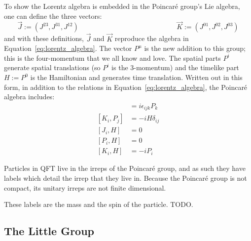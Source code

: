 \documentclass[11pt, oneside]{article}   	%
\theoremstyle{definition}
\begin{document}
To show the Lorentz algebra is embedded in the Poincar\'e group's Lie algebra, one can define the three vectors:
\begin{equation}
	\vec J := (J^{23}, J^{31}, J^{12}) \;\;\;\;\;\;\;\;\;\;\;\;\;\;\;\;\;\;\;\;\;\;\;\;\;\;\;\;\;\;\;\;\;\;\;\;\;\;\;\;\;\;\;\;\;\;\;\;\;\;\;
	\vec K := (J^{01}, J^{02}, J^{03})
\end{equation}
and with these definitions, $\vec J$ and $\vec K$ reproduce the algebra in Equation~\ref{eq:lorentz_algebra}. The 
vector $P^\mu$ is the new addition to this group; this is the four-momentum that we all know and love. The spatial 
parts $P^i$ generate spatial translations (so $P^i$ is the 3-momentum) and the timelike part $H := P^0$ is the Hamiltonian 
and generates time translation. Written out in this form, in addition to the relations in Equation~\ref{eq:lorentz_algebra}, 
the Poincar\'e algebra includes:
\begin{align}
	[J_i, P_j] &= i\epsilon_{ijk} P_k \nonumber \\
	[K_i, P_j] &= -iH\delta_{ij} \nonumber \\
	[J_i, H] &= 0 \label{eq:poincare_algebra_2} \\
	[P_i, H] &= 0 \nonumber \\
	[K_i, H] &= -i P_i\nonumber
\end{align}

Particles in QFT live in the irreps of the Poincar\'e group, and as such they have labels which detail the irrep that they 
live in. Because the Poincar\'e group is not compact, its unitary irreps are not finite dimensional. 

These labels are the mass and the spin of the particle. TODO.

\subsection{The Little Group}
\end{document}

